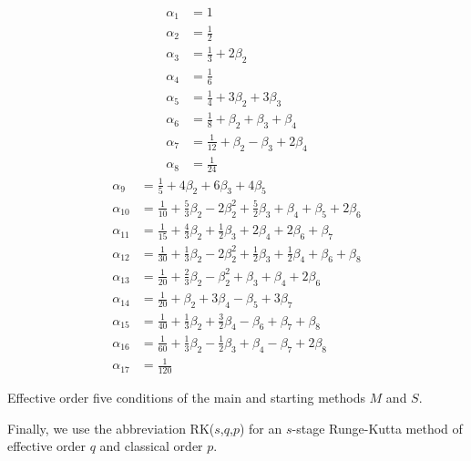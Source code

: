 \begin{table}
	\begin{multicols}{2}
		\begin{align*}
    		\alpha_1  &= 1 \\
     		\alpha_2  &= \tfrac{1}{2} \\
    		\alpha_3  &= \tfrac{1}{3} + 2\beta_2 \\
    		\alpha_4  &= \tfrac{1}{6} \\
    		\alpha_5  &= \tfrac{1}{4} + 3\beta_2 + 3\beta_3 \\
    		\alpha_6  &= \tfrac{1}{8} + \beta_2 + \beta_3 + \beta_4 \\
    		\alpha_7  &= \tfrac{1}{12} +\beta_2 - \beta_3 + 2\beta_4 \\
    		\alpha_8  &= \tfrac{1}{24}
    	\end{align*}
    	\vfill
    	\columnbreak
    	\begin{align*}
    		\alpha_9  &= \tfrac{1}{5} + 4\beta_2 + 6\beta_3 + 4\beta_5 \\
    		\alpha_{10} &= \tfrac{1}{10} + \tfrac{5}{3}\beta_2 - 2\beta_2^{2} + \tfrac{5}{2}\beta_3 + \beta_4 + \beta_5 + 2\beta_6 \\
    		\alpha_{11} &= \tfrac{1}{15} + \tfrac{4}{3}\beta_2 + \tfrac{1}{2}\beta_3 + 2\beta_4 + 2\beta_6 + \beta_7 \\
    		\alpha_{12} &= \tfrac{1}{30} + \tfrac{1}{3}\beta_2 - 2\beta_2^{2} + \tfrac{1}{2}\beta_3 + \tfrac{1}{2}\beta_4 + \beta_6 + \beta_8 \\
    		\alpha_{13} &= \tfrac{1}{20} + \tfrac{2}{3}\beta_2 - \beta_2^{2} + \beta_3 + \beta_4 + 2\beta_6 \\
    		\alpha_{14} &= \tfrac{1}{20} + \beta_2 + 3\beta_4 - \beta_5 + 3\beta_7 \\
    		\alpha_{15} &= \tfrac{1}{40} + \tfrac{1}{3}\beta_2 + \tfrac{3}{2}\beta_4 - \beta_6 + \beta_7 + \beta_8 \\
    		\alpha_{16} &= \tfrac{1}{60} + \tfrac{1}{3}\beta_2 - \tfrac{1}{2}\beta_3 + \beta_4 - \beta_7 + 2\beta_8 \\
    		\alpha_{17} &= \tfrac{1}{120}
    	\end{align*}
        \vfill
    \end{multicols}
    \caption{Effective order five conditions of the main and starting methods $M$ and $S$.}
    \label{tab:effectiveOCs}
\end{table}
Finally, we use the abbreviation RK($s$,$q$,$p$) for an $s$-stage Runge-Kutta method of effective order $q$ and classical order $p$.


